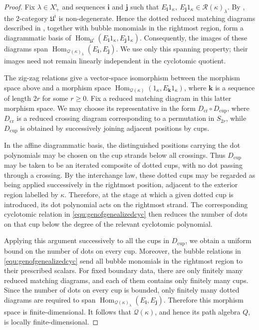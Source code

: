 \documentclass[a4,10pt]{amsart}
\numberwithin{equation}{section}
\theoremstyle{definition}
\begin{document}
\begin{proof} Fix $\lambda\in X^\imath_+$ and sequences
$\mathbf i$ and $\mathbf j$ such that
$
E_{\mathbf i}1_\kappa,\ E_{\mathbf j}1_\kappa
   \in \mathcal R(\kappa)_\lambda$. By \cite[Definition~5.8 and Theorem~5.10]{BWW25}, the 
$2$-category $\mathfrak U^\imath$ is non-degenerate. Hence the
dotted reduced matching diagrams described in
\cite[Definition~5.8]{BWW25}, together with bubble monomials in the
rightmost region, form a diagrammatic basis of
$
\operatorname{Hom}_{\mathfrak U^\imath}
   (E_{\mathbf i}1_\kappa,E_{\mathbf j}1_\kappa)$.
Consequently, the images of these diagrams span
$
\operatorname{Hom}_{\mathcal Q(\kappa)_\lambda}
   (E_{\mathbf i},E_{\mathbf j})$.
We use only this spanning property; their images need not remain
linearly independent in the cyclotomic quotient.

The zig-zag relations give a vector-space isomorphism between the
morphism space above and a morphism space
$
\operatorname{Hom}_{\mathcal Q(\kappa)}
   (1_\kappa,E_{\mathbf k}1_\kappa)$,
where $\mathbf k$ is a sequence of length $2r$ for some $r\geq 0$.
Fix a reduced matching diagram in this latter morphism space. We may
choose its representative in the form
$
D_{\mathrm{cr}}\circ D_{\mathrm{cup}}$,
where $D_{\mathrm{cr}}$ is a reduced crossing diagram corresponding
to a permutation in $S_{2r}$, while $D_{\mathrm{cup}}$ is obtained
by successively joining adjacent positions by cups.

In the affine diagrammatic basis, the distinguished positions
carrying the dot polynomials may be chosen on the cup strands below
all crossings. Thus $D_{\mathrm{cup}}$ may be taken to be an
iterated composite of dotted cups, with no dot passing through a
crossing. By the interchange law, these dotted cups may be regarded
as being applied successively in the rightmost position, adjacent
to the exterior region labelled by $\kappa$. Therefore, at the
stage at which a given dotted cup is introduced, its dot polynomial
acts on the rightmost strand. The corresponding cyclotomic relation
in \eqref{equ:genofgenealizedcyc} then reduces the number of dots on that cup below the degree
of the relevant cyclotomic polynomial.

Applying this argument successively to all the cups in
$D_{\mathrm{cup}}$, we obtain a uniform bound on the number of dots
on every cup. Moreover, the bubble relations in \eqref{equ:genofgenealizedcyc} send all
bubble monomials in the rightmost region to their prescribed
scalars. For fixed boundary data, there are only finitely many
reduced matching diagrams, and each of them contains only finitely
many cups. Since the number of dots on every cup is bounded, only
finitely many dotted diagrams are required to span
$
\operatorname{Hom}_{\mathcal Q(\kappa)_\lambda}
   (E_{\mathbf i},E_{\mathbf j})$.
Therefore this morphism space is finite-dimensional. It follows
that $\mathcal Q(\kappa)$, and hence its path algebra $Q$, is
locally finite-dimensional.
\end{proof}
\end{document}

